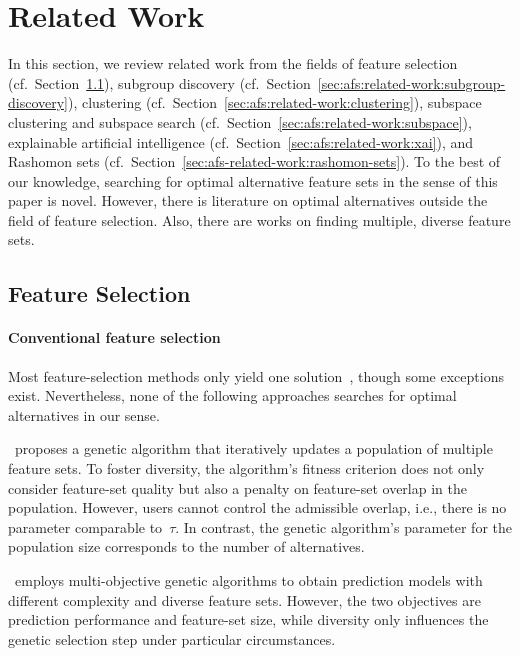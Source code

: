 \documentclass{article}
\theoremstyle{definition}
\begin{document}
\section{Related Work}
\label{sec:afs:related-work}

In this section, we review related work from the fields of feature selection (cf.~Section~\ref{sec:afs:related-work:feature-selection}), subgroup discovery (cf.~Section~\ref{sec:afs:related-work:subgroup-discovery}), clustering (cf.~Section~\ref{sec:afs:related-work:clustering}), subspace clustering and subspace search (cf.~Section~\ref{sec:afs:related-work:subspace}), explainable artificial intelligence (cf.~Section~\ref{sec:afs:related-work:xai}),
and Rashomon sets (cf.~Section~\ref{sec:afs-related-work:rashomon-sets}).
To the best of our knowledge, searching for optimal alternative feature sets in the sense of this paper is novel.
However, there is literature on optimal alternatives outside the field of feature selection.
Also, there are works on finding multiple, diverse feature sets.

\subsection{Feature Selection}
\label{sec:afs:related-work:feature-selection}

\paragraph{Conventional feature selection}

Most feature-selection methods only yield one solution~\cite{borboudakis2021extending}, though some exceptions exist.
Nevertheless, none of the following approaches searches for optimal alternatives in our sense.

\cite{siddiqi2020genetic}~proposes a genetic algorithm that iteratively updates a population of multiple feature sets.
To foster diversity, the algorithm's fitness criterion does not only consider feature-set quality but also a penalty on feature-set overlap in the population.
However, users cannot control the admissible overlap, i.e., there is no parameter comparable to~$\tau$.
In contrast, the genetic algorithm's parameter for the population size corresponds to the number of alternatives.

\cite{emmanouilidis1999selecting}~employs multi-objective genetic algorithms to obtain prediction models with different complexity and diverse feature sets.
However, the two objectives are prediction performance and feature-set size, while diversity only influences the genetic selection step under particular circumstances.
\end{document}
